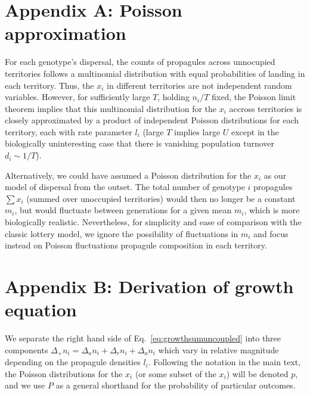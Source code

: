 \documentclass[11pt]{article}
\begin{document}


 

\section*{Appendix A: Poisson approximation}

For each genotype's dispersal, the counts of propagules across unnocupied territories follows a multinomial distribution with equal probabilities of landing in each territory. Thus, the $x_i$ in different territories are not independent random variables. However, for sufficiently large $T$, holding $n_i/T$ fixed, the Poisson limit theorem implies that this multinomial distribution for the $x_i$ accross territories is closely approximated by a product of independent Poisson distributions for each territory, each with rate parameter $l_i$ (large $T$ implies large $U$ except in the biologically uninteresting case that there is vanishing population turnover $d_i \sim 1/T$). 

Alternatively, we could have assumed a Poisson distribution for the $x_i$ as our model of dispersal from the outset. The total number of genotype $i$ propagules $\sum x_i$ (summed over unoccupied territories) would then no longer be a constant $m_i$, but would fluctuate between generations for a given mean $m_i$, which is more biologically realistic. Nevertheless, for simplicity and ease of comparison with the classic lottery model, we ignore the possibility of fluctuations in $m_i$ and focus instead on Poisson fluctuations propagule composition in each territory. 

\section*{Appendix B: Derivation of growth equation}

We separate the right hand side of Eq.~\eqref{eq:growthsumuncoupled} into three components $\Delta_+ n_i = \Delta_u n_i+\Delta_r n_i+\Delta_a n_i$ which vary in relative magnitude depending on the propagule densities $l_i$. Following the notation in the main text, the Poisson distributions for the $x_i$ (or some subset of the $x_i$) will be denoted $p$, and we use $P$ as a general shorthand for the probability of particular outcomes.
\end{document}
